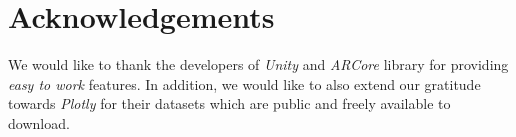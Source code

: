 \documentclass[journal]{vgtc}                %
\begin{document}
\section{Acknowledgements}
We would like to thank the developers of \textit{Unity} and \textit{ARCore} library for providing \textit{easy to work} features. In addition, we would like to also extend our gratitude towards \textit{Plotly} for their datasets which are public and freely available to download. 





\end{document}

